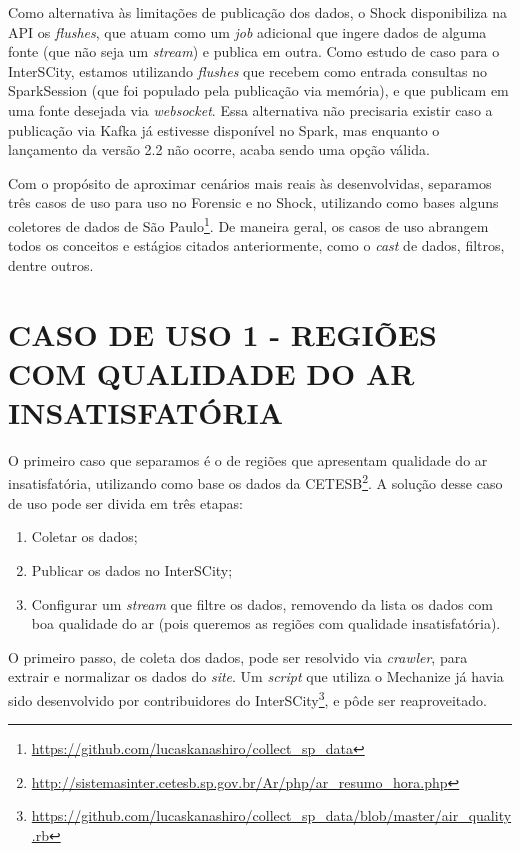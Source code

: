 

Como alternativa às limitações de publicação dos dados, o Shock disponibiliza
na API os \textit{flushes}, que atuam como um \textit{job} adicional que ingere
dados de alguma fonte (que não seja um \textit{stream}) e publica em outra.
Como estudo de caso para o InterSCity, estamos utilizando \textit{flushes} que
recebem como entrada consultas no SparkSession (que foi populado pela
publicação via memória), e que publicam em uma fonte desejada via
\textit{websocket}. Essa alternativa não precisaria existir caso
a publicação via Kafka já estivesse disponível no Spark, mas enquanto o
lançamento da versão 2.2 não ocorre, acaba sendo uma opção válida.

Com o propósito de aproximar cenários mais reais às desenvolvidas, separamos
três casos de uso para uso no Forensic e no Shock, utilizando como bases alguns
coletores de dados de São
Paulo\footnote{\url{https://github.com/lucaskanashiro/collect_sp_data}}. De
maneira geral, os casos de uso abrangem todos os conceitos e estágios citados
anteriormente, como o \textit{cast} de dados, filtros, dentre outros.

\section{CASO DE USO 1 - REGIÕES COM QUALIDADE DO AR INSATISFATÓRIA}

O primeiro caso que separamos é o de regiões que apresentam qualidade do ar
insatisfatória, utilizando como base os dados da
CETESB\footnote{\url{http://sistemasinter.cetesb.sp.gov.br/Ar/php/ar_resumo_hora.php}}.
A solução desse caso de uso pode ser divida em três etapas:
\begin{enumerate}
    \item Coletar os dados;
    \item Publicar os dados no InterSCity;
    \item Configurar um \textit{stream} que filtre os dados, removendo
        da lista os dados com boa qualidade do ar (pois queremos as regiões
        com qualidade insatisfatória).
\end{enumerate}

O primeiro passo, de coleta dos dados, pode ser resolvido via \textit{crawler},
para extrair e normalizar os dados do \textit{site}. Um \textit{script} que
utiliza o Mechanize já havia sido desenvolvido por contribuidores do
InterSCity\footnote{\url{https://github.com/lucaskanashiro/collect_sp_data/blob/master/air_quality.rb}},
e pôde ser reaproveitado.

